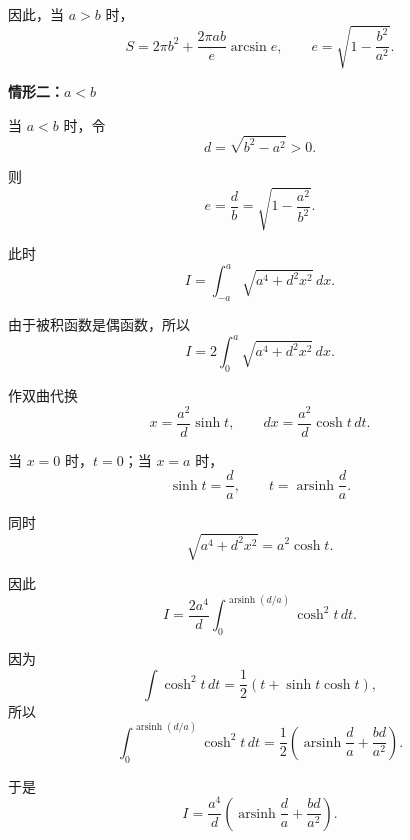\begin{proofbox}
\begin{description}[style=nextline, leftmargin=2.8em, labelsep=0.5em, itemsep=0.55em]
		      因此，当 $a>b$ 时，
		      \[
			      \boxed{
				      S
				      =
				      2\pi b^{2}
				      +
				      \frac{2\pi ab}{e}\arcsin e
			      },
			      \qquad
			      e=\sqrt{1-\frac{b^{2}}{a^{2}}}.
		      \]

	\end{description}

	\medskip

	\textbf{\textcolor{CProof}{情形二：$a<b$}}

	\begin{description}[style=nextline, leftmargin=2.8em, labelsep=0.5em, itemsep=0.55em]

		\item[\textbf{步骤六（双曲代换）：}]
		      当 $a<b$ 时，令
		      \[
			      d=\sqrt{b^{2}-a^{2}}>0.
		      \]

		      则
		      \[
			      e=\frac{d}{b}
			      =
			      \sqrt{1-\frac{a^{2}}{b^{2}}}.
		      \]

		      此时
		      \[
			      I
			      =
			      \int_{-a}^{a}
			      \sqrt{a^{4}+d^{2}x^{2}}\,dx.
		      \]

		      由于被积函数是偶函数，所以
		      \[
			      I
			      =
			      2\int_{0}^{a}
			      \sqrt{a^{4}+d^{2}x^{2}}\,dx.
		      \]

		      作双曲代换
		      \[
			      x=\frac{a^{2}}{d}\sinh t,
			      \qquad
			      dx=\frac{a^{2}}{d}\cosh t\,dt.
		      \]

		      当 $x=0$ 时，$t=0$；当 $x=a$ 时，
		      \[
			      \sinh t=\frac{d}{a},
			      \qquad
			      t=\operatorname{arsinh}\frac{d}{a}.
		      \]

		      同时
		      \[
			      \sqrt{a^{4}+d^{2}x^{2}}
			      =
			      a^{2}\cosh t.
		      \]

		      因此
		      \[
			      I
			      =
			      \frac{2a^{4}}{d}
			      \int_{0}^{\operatorname{arsinh}(d/a)}
			      \cosh^{2}t\,dt.
		      \]

		\item[\textbf{步骤七（积分回代）：}]
		      因为
		      \[
			      \int \cosh^{2}t\,dt
			      =
			      \frac12(t+\sinh t\cosh t),
		      \]
		      所以
		      \[
			      \int_{0}^{\operatorname{arsinh}(d/a)}
			      \cosh^{2}t\,dt
			      =
			      \frac12
			      \left(
			      \operatorname{arsinh}\frac{d}{a}
			      +
			      \frac{bd}{a^{2}}
			      \right).
		      \]

		      于是
		      \[
			      I
			      =
			      \frac{a^{4}}{d}
			      \left(
			      \operatorname{arsinh}\frac{d}{a}
			      +
			      \frac{bd}{a^{2}}
			      \right).
		      \]


\end{description}
\end{proofbox}
